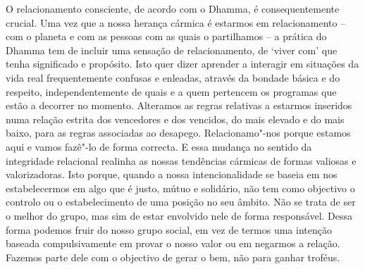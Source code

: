O relacionamento consciente, de acordo com o Dhamma, é consequentemente crucial. Uma vez que a nossa herança cármica é estarmos em relacionamento -- com o planeta e com as pessoas com as quais o partilhamos -- a prática do Dhamma tem de incluir uma sensação de relacionamento, de `viver com' que tenha significado e propósito. Isto quer dizer aprender a interagir em situações da vida real frequentemente confusas e enleadas, através da bondade básica e do respeito, independentemente de quais e a quem pertencem os programas que estão a decorrer no momento. Alteramos as regras relativas a estarmos inseridos numa relação estrita dos vencedores e dos vencidos, do mais elevado e do mais baixo, para as regras associadas ao desapego. Relacionamo"-nos porque estamos aqui e vamos fazê"-lo de forma correcta. E essa mudança no sentido da integridade relacional realinha as nossas tendências cármicas de formas valiosas e valorizadoras. Isto porque, quando a nossa intencionalidade se baseia em nos estabelecermos em algo que é justo, mútuo e solidário, não tem como objectivo o controlo ou o estabelecimento de uma posição no seu âmbito. Não se trata de ser o melhor do grupo, mas sim de estar envolvido nele de forma responsável. Dessa forma podemos fruir do nosso grupo social, em vez de termos uma intenção baseada compulsivamente em provar o nosso valor ou em negarmos a relação. Fazemos parte dele com o objectivo de gerar o bem, não para ganhar troféus.

